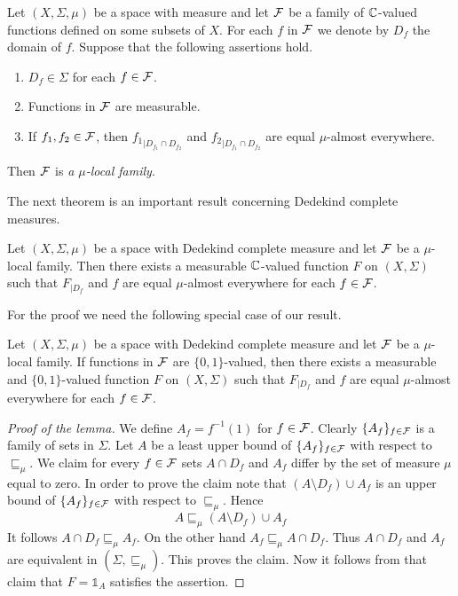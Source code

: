 \begin{definition}
  Let $(X,\Sigma,\mu)$ be a space with measure and let ${\mathcal F}$ be a family of ${\mathbb C}$-valued functions defined on some subsets of $X$. For each $f$ in ${\mathcal F}$ we denote by $D_f$ the domain of $f$. Suppose that the following assertions hold.
  \begin{enumerate}[label=\textbf{(\arabic*)}, leftmargin=*]
    \item $D_f \in \Sigma$ for each $f\in {\mathcal F}$.
    \item Functions in ${\mathcal F}$ are measurable.
    \item If $f_1,f_2 \in {\mathcal F}$, then ${f_1}_{\mid D_{f_1}\cap D_{f_2}}$ and ${f_2}_{\mid D_{f_1}\cap D_{f_2}}$ are equal $\mu$-almost everywhere.
  \end{enumerate}
  Then ${\mathcal F}$ is \textit{a $\mu$-local family}.
\end{definition}
\noindent
The next theorem is an important result concerning Dedekind complete measures.

\begin{theorem}\label{theorem:Dedekind_complete_local_families_can_be_glued}
  Let $(X,\Sigma,\mu)$ be a space with Dedekind complete measure and let ${\mathcal F}$ be a $\mu$-local family. Then there exists a measurable ${\mathbb C}$-valued function $F$ on $(X,\Sigma)$ such that $F_{\mid D_f}$ and $f$ are equal $\mu$-almost everywhere for each $f \in {\mathcal F}$.
\end{theorem}
\noindent
For the proof we need the following special case of our result.

\begin{lemma}\label{lemma:glueing_indicators_on_Dedekind_complete_measure}
  Let $(X,\Sigma,\mu)$ be a space with Dedekind complete measure and let ${\mathcal F}$ be a $\mu$-local family. If functions in ${\mathcal F}$ are $\{0,1\}$-valued, then there exists a measurable and $\{0,1\}$-valued function $F$ on $(X,\Sigma)$ such that $F_{\mid D_f}$ and $f$ are equal $\mu$-almost everywhere for each $f \in {\mathcal F}$.
\end{lemma}
\begin{proof}[Proof of the lemma]
  We define $A_f = f^{-1}(1)$ for $f \in {\mathcal F}$. Clearly $\{A_f\}_{f\in {\mathcal F}}$ is a family of sets in $\Sigma$. Let $A$ be a least upper bound of $\{A_{f}\}_{f\in {\mathcal F}}$ with respect to $\sqsubseteq_{\mu}$. We claim for every $f \in {\mathcal F}$ sets $A\cap D_f$ and $A_f$ differ by the set of measure $\mu$ equal to zero. In order to prove the claim note that $\left(A \setminus D_f\right) \cup A_{f}$ is an upper bound of $\{A_{f}\}_{f\in {\mathcal F}}$ with respect to $\sqsubseteq_{\mu}$. Hence
  $$A \sqsubseteq_{\mu} \left(A \setminus D_f\right) \cup A_{f}$$
  It follows $A \cap D_f \sqsubseteq_{\mu} A_{f}$. On the other hand $A_f \sqsubseteq_{\mu} A\cap D_f$. Thus $A \cap D_f$ and $A_{f}$ are equivalent in $\left(\Sigma, \sqsubseteq_{\mu}\right)$. This proves the claim. Now it follows from that claim that $F = \mathbb{1}_{A}$ satisfies the assertion.
\end{proof}

